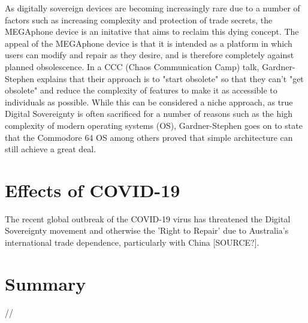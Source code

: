 As digitally sovereign devices are becoming increasingly rare due to a number of factors such as increasing complexity and protection of trade secrets, the MEGAphone device is an initative that aims to reclaim this dying concept. %
The appeal of the MEGAphone device is that it is intended as a platform in which users can modify and repair as they desire, and is therefore completely against planned obsolescence.
In a CCC (Chaos Communication Camp) talk, Gardner-Stephen explains that their approach is to "start obsolete" so that they can't "get obsolete" and reduce the complexity of features to make it as accessible to individuals as possible\cite{mobilehistory}.
While this can be considered a niche approach, as true Digital Sovereignty is often sacrificed for a number of reasons such as the high complexity of modern operating systems (OS), Gardner-Stephen goes on to state that the Commodore 64 OS among others proved that simple architecture can still achieve a great deal.


\section{Effects of COVID-19}
The recent global outbreak of the COVID-19 virus has threatened the Digital Sovereignty movement and otherwise the 'Right to Repair' due to Australia's international trade dependence, particularly with China [SOURCE?].


\section{Summary}
//